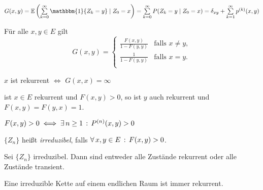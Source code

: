 \documentclass{cheat-sheet}
\newcommand{\E}{\mathbb{E}} %
\newcommand{\ind}{\mathbbm{1}} %
\begin{document}
\begin{bem}
  $G(x, y) = \E \left( \sum_{k=0}^\infty \ind \{ Z_k = y \} \mid Z_0 = x \right) = \sum_{k=0}^\infty P(Z_k = y \mid Z_0 = x) = \delta_{xy} + \sum_{k=1}^\infty p^{(k)}(x, y)$
\end{bem}

\begin{satz}
  Für alle $x, y \in E$ gilt
  \[
    G(x, y) = 
    \begin{cases}
      \tfrac{F(x, y)}{1 - F(y, y)} & \text{falls $x \neq y$}, \\
      \tfrac{1}{1 - F(y, y)} & \text{falls $x = y$}. \\
    \end{cases}
  \]
\end{satz}

\begin{kor}
  $x$ ist rekurrent $\iff$ $G(x, x) = \infty$
\end{kor}

\begin{satz}
  ist $x \in E$ rekurrent und $F(x, y) > 0$, so ist $y$ auch rekurrent und $F(x, y) = F(y, x) = 1$.
\end{satz}

\iffalse
\begin{interp}
  $F(x, y) > 0$ bedeutet, dass nach jedem Besuch in~$x$ der Zustand $y$ auch besucht wird mit positiver Wahrscheinlichkeit und die Rekurrenz von~$x$ bedeutet, dass $x$ unendlich oft besucht wird.
  Der Satz sagt, dass dann auch $y$ unendlich oft besucht wird.
\end{interp}
\fi

\begin{bem}
  $F(x, y) > 0 \iff \exists \, {n \geq 1} \,:\, P^{(n)}(x, y) > 0$
\end{bem}

\begin{defn}
  $\{ Z_n \}$ heißt \emph{irreduzibel}, falls $\forall \, {x, y \in E} \,:\, F(x, y) > 0$.
\end{defn}

\begin{satz}
  Sei $\{ Z_n \}$ irreduzibel.
  Dann sind entweder alle Zustände rekurrent oder alle Zustände transient.
\end{satz}


\begin{satz}
  Eine irreduzible Kette auf einem endlichen Raum ist immer rekurrent.
\end{satz}
\end{document}
